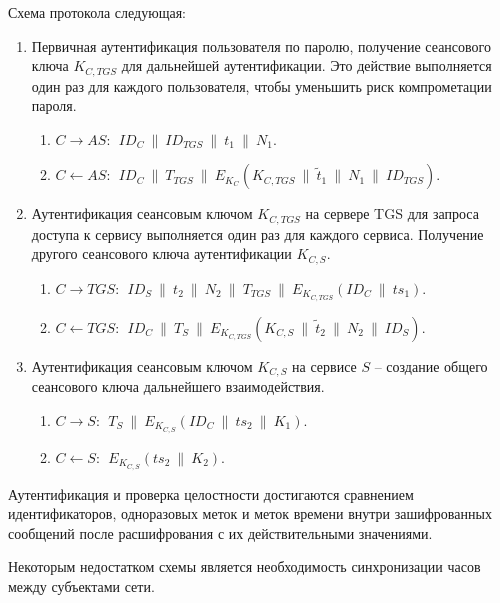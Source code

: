 Схема протокола следующая:
\begin{enumerate}
    \item Первичная аутентификация пользователя по паролю, получение сеансового ключа $K_{C,TGS}$ для дальнейшей аутентификации. Это действие выполняется один раз для каждого пользователя, чтобы уменьшить риск компрометации пароля.
        \begin{enumerate}
            \item $C \rightarrow AS: ~~ ID_C ~\|~ ID_{TGS} ~\|~ t_1 ~\|~ N_1$.
            \item $C \leftarrow AS: ~~ ID_C ~\|~ T_{TGS} ~\|~ E_{K_C}( K_{C,TGS} ~\|~ \tilde{t}_1 ~\|~ N_1 ~\|~ ID_{TGS})$.
        \end{enumerate}
    \item Аутентификация сеансовым ключом $K_{C,TGS}$ на сервере TGS для запроса доступа к сервису выполняется один раз для каждого сервиса. Получение другого сеансового ключа аутентификации $K_{C,S}$.
        \begin{enumerate}
            \item $C \rightarrow TGS: ~~ ID_S ~\|~ t_2 ~\|~ N_2 ~\|~ T_{TGS} ~\|~ E_{K_{C,TGS}}(ID_C ~\|~ ts_1)$.
            \item $C \leftarrow TGS: ~~ ID_C ~\|~ T_{S} ~\|~ E_{K_{C,TGS}}( K_{C,S} ~\|~ \tilde{t}_2 ~\|~ N_2 ~\|~ ID_S)$.
        \end{enumerate}
    \item Аутентификация сеансовым ключом $K_{C,S}$ на сервисе $S$ -- создание общего сеансового ключа дальнейшего взаимодействия.
        \begin{enumerate}
            \item $C \rightarrow S: ~~ T_{S} ~\|~ E_{K_{C,S}}(ID_C ~\|~ ts_2 ~\|~ K_1)$.
            \item $C \leftarrow S: ~~ E_{K_{C,S}}( ts_2 ~\|~ K_2)$.
        \end{enumerate}
\end{enumerate}

Аутентификация и проверка целостности достигаются сравнением идентификаторов, одноразовых меток и меток времени внутри зашифрованных сообщений после расшифрования с их действительными значениями.

Некоторым недостатком схемы является необходимость синхронизации часов между субъектами сети.
